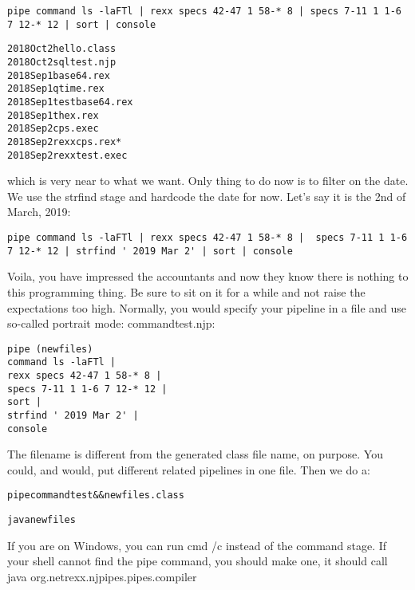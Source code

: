 \begin{lstlisting}
pipe command ls -laFTl | rexx specs 42-47 1 58-* 8 | specs 7-11 1 1-6 7 12-* 12 | sort | console
\end{lstlisting}
\begin{alltt}
2018 Oct 2 hello.class
2018 Oct 2 sqltest.njp
2018 Sep 1 base64.rex
2018 Sep 1 qtime.rex
2018 Sep 1 testbase64.rex
2018 Sep 1 thex.rex
2018 Sep 2 cps.exec
2018 Sep 2 rexxcps.rex*
2018 Sep 2 rexxtest.exec
\end{alltt}
which is very near to what we want. Only thing to do now is to filter
on the date. We use the strfind stage and hardcode the date for
now. Let's say it is the 2nd of March, 2019:
\begin{lstlisting}
pipe command ls -laFTl | rexx specs 42-47 1 58-* 8 |  specs 7-11 1 1-6
7 12-* 12 | strfind ' 2019 Mar 2' | sort | console
\end{lstlisting}
Voila, you have impressed the accountants and now they know there is nothing to this programming thing. Be sure to sit on it for a while and not raise the expectations too high.
Normally, you would specify your pipeline in a file and use so-called portrait mode:
commandtest.njp:
\begin{lstlisting}
pipe (newfiles)
command ls -laFTl |
rexx specs 42-47 1 58-* 8 |
specs 7-11 1 1-6 7 12-* 12 |
sort |
strfind ' 2019 Mar 2' |
console
\end{lstlisting}
The filename is different from the generated class file name, on purpose. You could, and would, put different related pipelines in one file.
Then we do a:
\begin{alltt}
pipe commandtest && newfiles.class
\end{alltt}


\begin{alltt}
java newfiles
\end{alltt}
If you are on Windows, you can run cmd /c instead of the command stage. If your shell cannot find the pipe command, you should make one, it should call 
java org.netrexx.njpipes.pipes.compiler

